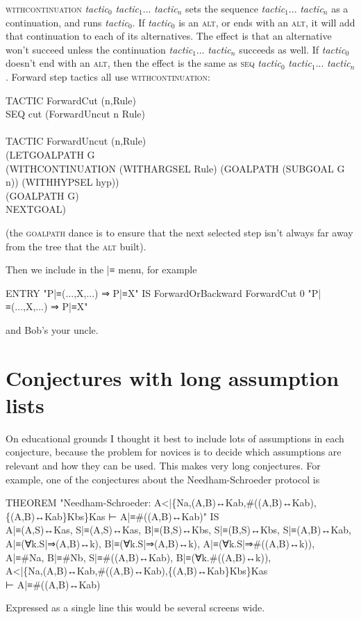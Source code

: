 \textsc{withcontinuation} \textit{tactic}$_{0}$ \textit{tactic}$_{1}$... \textit{tactic}$_{\textit{n}}$ sets the sequence \textit{tactic}$_{1}$... \textit{tactic}$_{\textit{n}}$ as a continuation, and runs \textit{tactic}$_{0}$. If \textit{tactic}$_{0}$ is an \textsc{alt}, or ends with an \textsc{alt}, it will add that continuation to each of its alternatives. The effect is that an alternative won't succeed unless the continuation \textit{tactic}$_{1}$... \textit{tactic}$_{\textit{n}}$ succeeds as well. If \textit{tactic}$_{0}$ doesn't end with an \textsc{alt}, then the effect is the same as \textsc{seq} \textit{tactic}$_{0}$ \textit{tactic}$_{1}$... \textit{tactic}$_{\textit{n}}$. Forward step tactics all use \textsc{withcontinuation}:
\begin{japeish}
TACTIC ForwardCut (n,Rule) \\
\tab SEQ cut (ForwardUncut n Rule) \\
 \\
TACTIC ForwardUncut (n,Rule) \\
\tab (LETGOALPATH G  \\
\tab \tab (WITHCONTINUATION (WITHARGSEL Rule) (GOALPATH (SUBGOAL G n)) (WITHHYPSEL hyp)) \\
\tab \tab (GOALPATH G)  \\
\tab \tab NEXTGOAL)
\end{japeish}
(the \textsc{goalpath} dance is to ensure that the next selected step isn't always far away from the tree that the \textsc{alt} built).

Then we include in the |≡ menu, for example
\begin{japeish}
ENTRY "P|≡(...,X,...) ⇒ P|≡X"             IS ForwardOrBackward ForwardCut 0 "P|≡(...,X,...) ⇒ P|≡X"
\end{japeish}
and Bob's your uncle.

\section{Conjectures with long assumption lists}

On educational grounds I thought it best to include lots of assumptions in each conjecture, because the problem for novices is to decide which assumptions are relevant and how they can be used. This makes very long conjectures. For example, one of the conjectures about the Needham-Schroeder protocol is
\begin{japeish}
THEOREM "Needham-Schroeder: A<|\{Na,(A,B)↔Kab,\#((A,B)↔Kab),\{(A,B)↔Kab\}Kbs\}Kas ⊢ A|≡\#((A,B)↔Kab)" IS \\
\tab A|≡(A,S)↔Kas, S|≡(A,S)↔Kas, B|≡(B,S)↔Kbs, S|≡(B,S)↔Kbs, S|≡(A,B)↔Kab,\\
\tab A|≡(∀k.S|⇒(A,B)↔k), B|≡(∀k.S|⇒(A,B)↔k), A|≡(∀k.S|⇒\#((A,B)↔k)), \\
\tab A|≡\#Na, B|≡\#Nb, S|≡\#((A,B)↔Kab), B|≡(∀k.\#((A,B)↔k)), \\
\tab A<|\{Na,(A,B)↔Kab,\#((A,B)↔Kab),\{(A,B)↔Kab\}Kbs\}Kas \\
\tab ⊢ A|≡\#((A,B)↔Kab)
\end{japeish}
Expressed as a single line this would be several screens wide.

